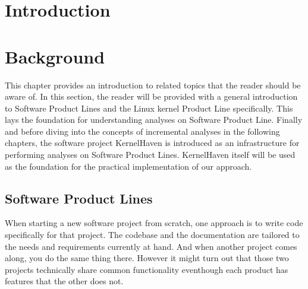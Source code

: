 \documentclass[a4paper]{article}
\begin{document}
\newpage
\lhead{{}}
\rhead{\leftmark}
\pagestyle{fancy}

\listoftodos[Notes]
\clearpage

\tableofcontents
\newpage


\maketitle
\newpage

\setcounter{page}{1}
\lhead{{}}
\rhead{\leftmark}
\pagestyle{fancy}



\section{Introduction}



\clearpage
\section{Background}

This chapter provides an introduction to related topics that the reader should be aware of. 
In this section, the reader will be provided with a general introduction to Software Product Lines and the Linux kernel Product Line specifically. This lays the foundation for understanding analyses on Software Product Line. Finally and before diving into the concepts of incremental analyses in the following chapters, the software project KernelHaven is introduced as an infrastructure for performing analyses on Software Product Lines. KernelHaven itself will be used as the foundation for the practical implementation of our approach.

\subsection{Software Product Lines}\label{spl}

When starting a new software project from scratch, one approach is to write code specifically for that project. The codebase and the documentation are tailored to the needs and requirements currently at hand. And when another project comes along, you do the same thing there. However it might turn out that those two projects technically share common functionality eventhough each product has features that the other does not.
\end{document}
